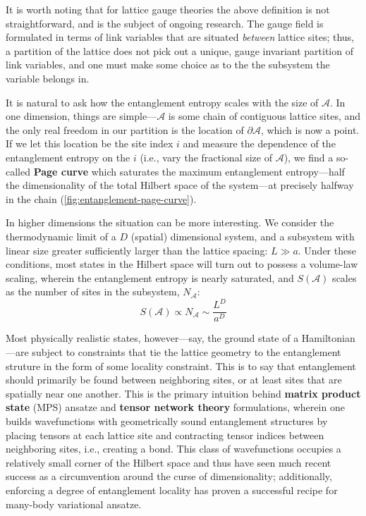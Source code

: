 \documentclass{report}
\begin{document}
\begin{alertbox}
	It is worth noting that for lattice gauge theories the above definition is not
	straightforward, and is the subject of ongoing research. The gauge field is
	formulated in terms of link variables that are situated \textit{between}
	lattice sites; thus, a partition of the lattice does not pick out a unique,
	gauge invariant partition of link variables, and one must make some choice
	as to the the subsystem the variable belongs in.
\end{alertbox}

It is natural to ask how the entanglement entropy scales 
with the size of $ \mathcal{A} $. In one dimension, things are simple---$ \mathcal{A} $
is some chain of contiguous lattice sites, and the only real freedom in our 
partition is the location of $ \partial \mathcal{A} $, which is now a point. 
If we let this location be the site index $ i $ and measure the dependence of the 
entanglement entropy on the $ i $ (i.e., vary the fractional size of $ \mathcal{A} $),
we find a so-called \textbf{Page curve} which saturates the maximum entanglement
entropy---half the dimensionality of the total Hilbert space of the system---at
precisely halfway in the chain (\cref{fig:entanglement-page-curve}).

In higher dimensions the situation can be more interesting. We consider 
the thermodynamic limit of a $ D $ (spatial) dimensional system, and a subsystem
with linear size greater sufficiently larger than the lattice spacing: $ L \gg
a$. Under these conditions, most states in the Hilbert space will turn out to
possess a volume-law scaling, wherein the entanglement entropy is nearly
saturated, and $ S(\mathcal{A}) $ scales as the number of sites in the
subsystem, $ N_{\mathcal{A}} $:
\begin{equation*}
	S(\mathcal{A}) \propto N_{\mathcal{A}} \sim \frac{L^D}{a^D} 
\end{equation*}

Most physically realistic states, however---say, the ground state of a 
Hamiltonian---are subject to constraints that tie the lattice geometry to the 
entanglement struture in the form of some locality constraint. This is to say 
that entanglement should primarily be found between neighboring sites, or at 
least sites that are spatially near one another. This is the primary intuition 
behind \textbf{matrix product state} (MPS) ansatze and \textbf{tensor network theory}
formulations, wherein one builds wavefunctions with geometrically sound entanglement 
structures by placing tensors at each lattice site and contracting tensor indices 
between neighboring sites, i.e., creating a bond. This class of wavefunctions
occupies a relatively small corner of the Hilbert space and thus have seen much
recent success as a circumvention around the curse of dimensionality;
additionally, enforcing a degree of entanglement locality has proven a
successful recipe for many-body variational ansatze. 
\end{document}
